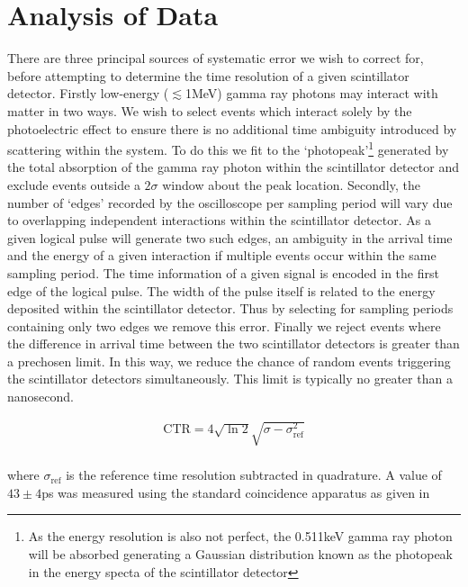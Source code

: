 \section{Analysis of Data}
There are three principal sources of systematic error we wish to correct for, before attempting to determine the time resolution of a given scintillator detector. Firstly low-energy ($\lesssim$1MeV) gamma ray photons may interact with matter in two ways. We wish to select events which interact solely by the photoelectric effect to ensure there is no additional time ambiguity introduced by scattering within the system. To do this we fit to the `photopeak'\footnote{As the energy resolution is also not perfect, the 0.511keV gamma ray photon will be absorbed generating a Gaussian distribution known as the photopeak in the energy specta of the scintillator detector} generated by the total absorption of the gamma ray photon within the scintillator detector and exclude events outside a $2\sigma$ window about the peak location. Secondly, the number of `edges' recorded by the oscilloscope per sampling period will vary due to overlapping independent interactions within the scintillator detector. As a given logical pulse will generate two such edges, an ambiguity in the arrival time and the energy of a given interaction if multiple events occur within the same sampling period. The time information of a given signal is encoded in the first edge of the logical pulse. The width of the pulse itself is related to the energy deposited within the scintillator detector. Thus by selecting for sampling periods containing only two edges we remove this error. Finally we reject events where the difference in arrival time between the two scintillator detectors is greater than a prechosen limit. In this way, we reduce the chance of random events triggering the scintillator detectors simultaneously. This limit is typically no greater than a nanosecond.

\begin{align}
\text{CTR} = 4\sqrt{\ln{2}}\sqrt{\sigma-\sigma_\textrm{ref}^2}\\
\label{eqn:ctr-quad}
\end{align}

where $\sigma_\text{ref}$ is the reference time resolution subtracted in quadrature. A value of $43\pm4$ps was measured using the standard coincidence apparatus as given in \cite{ch_Meyer_Pizzichemi_Lecoq_2013}


